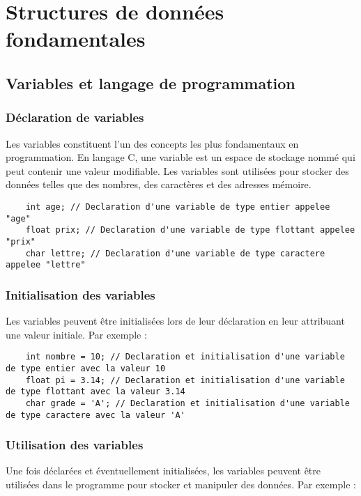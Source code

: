 \chapter{Structures de donn\'ees fondamentales}
\section{Variables et langage de programmation}

\subsection{Déclaration de variables}

Les variables constituent l'un des concepts les plus fondamentaux en programmation. En langage C, une variable est un espace de stockage nommé qui peut contenir une valeur modifiable. Les variables sont utilisées pour stocker des données telles que des nombres, des caractères et des adresses mémoire.

\begin{lstlisting}
	int age; // Declaration d'une variable de type entier appelee "age"
	float prix; // Declaration d'une variable de type flottant appelee "prix"
	char lettre; // Declaration d'une variable de type caractere appelee "lettre"
\end{lstlisting}

\subsection{Initialisation des variables}

Les variables peuvent être initialisées lors de leur déclaration en leur attribuant une valeur initiale. Par exemple :

\begin{lstlisting}
	int nombre = 10; // Declaration et initialisation d'une variable de type entier avec la valeur 10
	float pi = 3.14; // Declaration et initialisation d'une variable de type flottant avec la valeur 3.14
	char grade = 'A'; // Declaration et initialisation d'une variable de type caractere avec la valeur 'A'
\end{lstlisting}

\subsection{Utilisation des variables}

Une fois déclarées et éventuellement initialisées, les variables peuvent être utilisées dans le programme pour stocker et manipuler des données. Par exemple :

